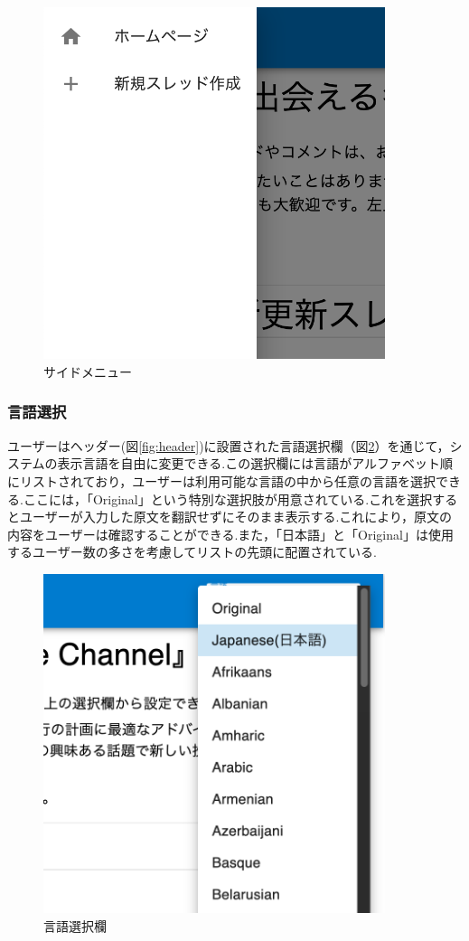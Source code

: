 \documentclass[b5paper,12pt,dvipdfmx]{jsreport}
\begin{document}
\begin{figure}[H]
	\centering
    \includegraphics[width=100mm,height=103.02mm]{./img/feature/side_menu.png}
	\caption{サイドメニュー}
	\label{fig:side_menu}
\end{figure}


\subsubsection{言語選択}
ユーザーはヘッダー(図\ref{fig:header})に設置された言語選択欄（図\ref{fig:language_select}）を通じて，システムの表示言語を自由に変更できる.この選択欄には言語がアルファベット順にリストされており，ユーザーは利用可能な言語の中から任意の言語を選択できる.ここには，「Original」という特別な選択肢が用意されている.これを選択するとユーザーが入力した原文を翻訳せずにそのまま表示する.これにより，原文の内容をユーザーは確認することができる.また，「日本語」と「Original」は使用するユーザー数の多さを考慮してリストの先頭に配置されている.

\begin{figure}[H]
	\centering
    \includegraphics[width=100mm,height=99.22mm]{./img/feature/language_select.png}
	\caption{言語選択欄}
	\label{fig:language_select}
\end{figure}
\end{document}
